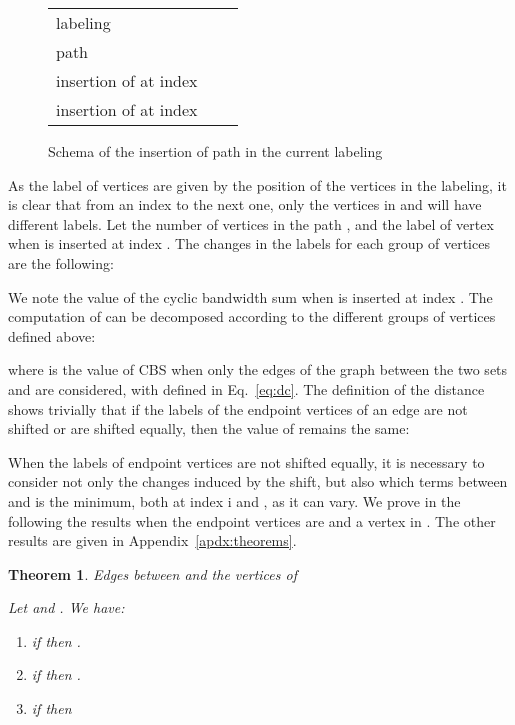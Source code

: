 \documentclass{scrartcl}
\theoremstyle{plain}
\newtheorem{theorem}{Theorem}[section]
\newcommand{\cbs}{CBS}
\begin{document}
\begin{figure}[!h]
\begin{tabular}{lll}
labeling  &  \\
path &  \\
insertion of  at index  &  \\
insertion of  at index  & 
\end{tabular}
\caption{Schema of the insertion of path  in the current 
labeling \label{fig:incr1}}
\end{figure}

As the label of vertices are given by the position of the vertices in the 
labeling, it is clear that from an index to the next one, only the vertices in 
 and  will have different labels. Let  the number of vertices in 
the path , and  the label of vertex  when  is inserted at 
index . The changes in the labels for each group of vertices are the 
following:

We note  the value of the cyclic bandwidth sum when  is 
inserted at index . The computation of  can be decomposed 
according to the different groups of vertices defined above:

where  is the value of \cbs{} when only the edges of the graph 
between the two sets  and  are considered, with  
defined in Eq.~\ref{eq:dc}. The definition of the distance  shows trivially 
that if the labels of the endpoint vertices of an edge are not shifted or are 
shifted equally, then the value of  remains the same:


When the labels of endpoint vertices are not shifted equally, it is necessary to 
consider not only the changes induced by the shift, but also which terms between 
 and  is the minimum, both at index i 
and , as it can vary. We prove in the following the results when the 
endpoint vertices are  and a vertex in . The other results are given in 
Appendix~\ref{apdx:theorems}.

\begin{theorem}{Edges between  and the vertices of }

\label{thm:k01}
Let  and . We have:
\begin{enumerate}
\item if  then
  .
\item if  then
  .
\item  if   then 


\end{enumerate}

\end{theorem}
\end{document}
